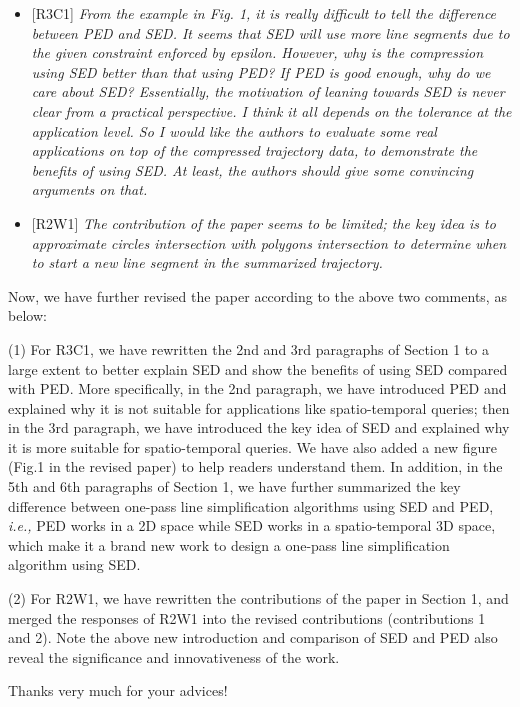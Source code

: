 \documentclass{letter}
\newcommand{\ie}{\emph{i.e.,}\xspace}
\begin{document}
\begin{itemize}
  \item {{[R3C1]} \emph{From the example in Fig. 1, it is really difficult to tell the difference between PED and SED. It seems that SED will use more line segments due to the given constraint enforced by epsilon. However, why is the compression using SED better than that using PED? If PED is good enough, why do we care about SED? Essentially, the motivation of leaning towards SED is never clear from a practical perspective. I think it all depends on the tolerance at the application level. So I would like the authors to evaluate some real applications on top of the compressed trajectory data, to demonstrate the benefits of using SED. At least, the authors should give some convincing arguments on that.}}
  \item {{[R2W1]} \emph{The contribution of the paper seems to be limited; the key idea is to approximate circles intersection with polygons intersection to determine when to start a new line segment in the summarized trajectory.}}
\end{itemize}

Now, we have further revised the paper according to the above two comments, as below:

(1) For R3C1, we have rewritten the 2nd and 3rd paragraphs of Section 1 to a large extent to better explain SED and show the benefits of using SED compared with PED.
More specifically, in the 2nd paragraph, we have introduced PED and explained why it is not suitable for applications like spatio-temporal queries; then in the 3rd paragraph, we have introduced the key idea of SED and explained why it is more suitable for spatio-temporal queries.
We have also added a new figure (Fig.1 in the revised paper) to help readers understand them. In addition, in the 5th and 6th paragraphs of Section 1, we have further summarized the key difference between one-pass line simplification algorithms using SED and PED, \ie PED works in a 2D space while SED works in a spatio-temporal 3D space, which make it a brand new work to design a one-pass line simplification algorithm using SED.

(2) For R2W1, we have rewritten the contributions of the paper in Section 1, and merged the responses of {R2W1} into the revised contributions (contributions 1 and 2). Note the above new introduction and comparison of SED and PED also reveal the significance and innovativeness of the work.

Thanks very much for your advices!
\end{document}
